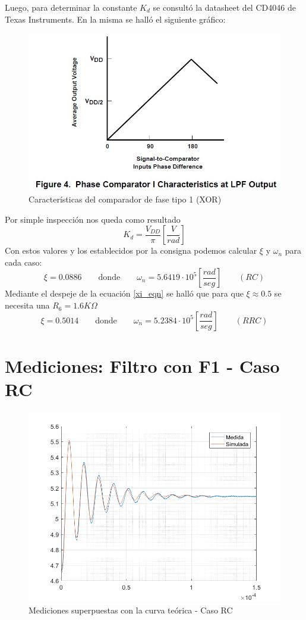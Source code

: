 \documentclass{article}
\begin{document}
Luego, para determinar la constante $K_d$ se consultó la datasheet del CD4046 de Texas Instruments. En la misma se halló el siguiente gráfico:
\begin{figure}[H]
\centering
\includegraphics[width=0.6\linewidth]{images/Kd.jpg}
\caption{Características del comparador de fase tipo 1 (XOR)}
\label{fig:comp1}
\end{figure}
Por simple inspección nos queda como resultado
\[ K_d= \frac{V_{DD}}{\pi} \left[\frac{V}{rad}\right] \]
Con estos valores y los establecidos por la consigna podemos calcular $\xi$ y $\omega_n$ para cada caso:
\[ \xi = 0.0886 \qquad \text{donde} \qquad \omega_n = 5.6419\cdot 10^{5} \left[\frac{rad}{seg}\right] \qquad (RC) \]
Mediante el despeje de la ecuación \ref{xi_eqn} se halló que para que $\xi \approx 0.5$ se necesita una $R_6 = 1.6K\Omega$
\[ \xi = 0.5014 \qquad \text{donde} \qquad \omega_n = 5.2384\cdot 10^{5} \left[\frac{rad}{seg}\right] \qquad (RRC) \]


\newpage
\section*{Mediciones: Filtro con F1 - Caso RC}

\begin{figure}[H]
\centering
\includegraphics[width=0.8\linewidth]{images/conF1_superpuestas.PNG}
\caption{Mediciones superpuestas con la curva teórica - Caso RC}
\label{fig:superpF1}
\end{figure}
\end{document}
